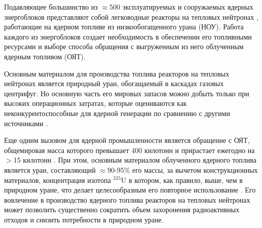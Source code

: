 {\actuality}

Подавляющее большинство из $\approx$500 эксплуатируемых и сооружаемых ядерных энергоблоков представляют собой легководные реакторы на тепловых нейтронах \cite{PRISHome}, работающие на ядерном топливе из низкообогащенного урана (НОУ). Работа каждого из энергоблоков создает необходимость в обеспечении его топливными ресурсами и выборе способа обращения с выгруженным из него облученным ядерным топливом (ОЯТ).

Основным материалом для производства топлива реакторов на тепловых нейтронах является природный уран, обогащаемый в каскадах газовых центрифуг. Но основную часть его мировых запасов можно добыть только при высоких операционных затратах, которые оцениваются как неконкурентоспособные для ядерной генерации по сравнению с другими источниками \cite{Uranium2022,WorldDistributionUranium2018,hartardCompetitionConflictsResource2015}. 

Еще одним вызовом для ядерной промышленности является обращение с ОЯТ, общемировая масса которого превышает 400 килотонн и прирастает ежегодно на $>$15 килотонн \cite{kaygorodcevProblemyPerspektivyRazvitiya2021,UseReprocessedUranium2020WNA}. При этом, основным материалом облученного ядерного топлива является уран, составляющий $\approx$90-95\% его массы, за вычетом конструкционных материалов, концентрация изотопа $^{235}$U в котором, как правило, выше, чем в природном уране, что делает целесообразным его повторное использование \cite{NikipelovNikipelovSudby}. Его вовлечение в производство ядерного топлива реакторов на тепловых нейтронах может позволить существенно сократить объем захоронения радиоактивных отходов и снизить потребности в природном уране.

